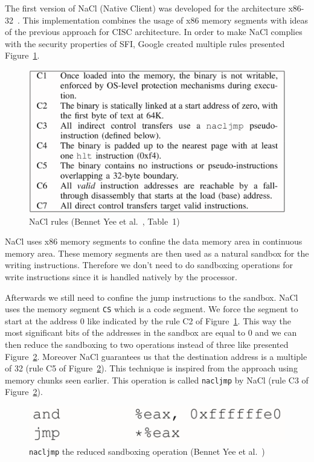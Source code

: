 \documentclass[11pt]{sdm}
\begin{document}
The first version of NaCl (Native Client) was developed for the architecture x86-32~\cite{Yee:2010:NCS:1629175.1629203}. This implementation combines the usage of x86 memory segments with ideas of the previous approach for CISC architecture. In order to make NaCl complies with the security properties of SFI, Google created multiple rules presented Figure~\ref{nacl_constraints}.

\begin{figure}[!ht]
\centering
\includegraphics[scale=0.25]{images/nacl_constraints.png}
\caption{NaCl rules (Bennet Yee et al.~\cite{Yee:2010:NCS:1629175.1629203}, Table~1)}
\label{nacl_constraints}
\end{figure}


NaCl uses x86 memory segments to confine the data memory area in continuous memory area. These memory segments are then used as a natural sandbox for the writing instructions. Therefore we don't need to do sandboxing operations for write instructions since it is handled natively by the processor.

Afterwards we still need to confine the jump instructions to the sandbox. NaCl uses the memory segment \texttt{CS} which is a code segment. We force the segment to start at the address 0 like indicated by the rule C2 of Figure~\ref{nacl_constraints}. This way the most significant bits of the addresses in the sandbox are equal to 0 and we can then reduce the sandboxing to two operations instead of three like presented Figure~\ref{nacl_jump}.
Moreover NaCl guarantees us that the destination address is a multiple of 32 (rule C5 of Figure~\ref{nacl_jump}). This technique is inspired from the approach using memory chunks seen earlier. This operation  is called \texttt{nacljmp} by NaCl (rule C3 of Figure~\ref{nacl_jump}).

\begin{figure}[!ht]
\centering
\includegraphics[scale=0.22]{images/nacl_jump.png}
\caption{\texttt{nacljmp} the reduced sandboxing operation (Bennet Yee et al.~\cite{Yee:2010:NCS:1629175.1629203})}
\label{nacl_jump}
\end{figure}
\end{document}
